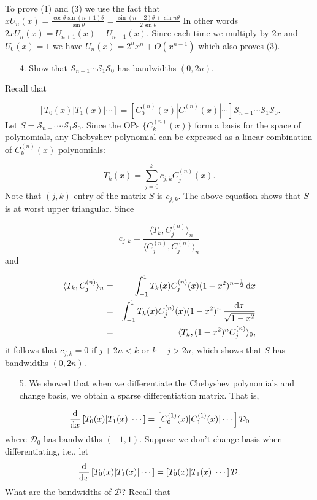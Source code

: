 \documentclass[12pt,a4paper]{article}
\begin{document}
To prove (1) and (3) we use the fact that $xU_n(x)=\frac{\cos\theta\sin(n+1)\theta}{\sin\theta}=\frac{\sin (n+2)\theta+\sin n\theta}{2\sin\theta}$ In other words $2xU_n(x)=U_{n+1}(x)+U_{n-1}(x)$. Since each time we multiply by $2x$ and $U_0(x)=1$ we have $U_n(x) = 2^n x^n + O(x^{n-1})$ which also proves (3).

\begin{itemize}
\item[4. ] Show that $\mathcal{S}_{n-1}\cdots\mathcal{S}_1\mathcal{S}_0$ has bandwidths $(0,2n)$.

\end{itemize}
Recall that 

\[
\left[T_0(x) | T_1(x) | \cdots  \right] =\left[C^{(n)}_0(x) | C^{(n)}_1(x) | \cdots  \right]  \mathcal{S}_{n-1}\cdots\mathcal{S}_1\mathcal{S}_0.
\]
Let $S = \mathcal{S}_{n-1}\cdots\mathcal{S}_1\mathcal{S}_0$.  Since the OPs $\{C^{(n)}_k(x)\} $ form a basis for the space of polynomials, any Chebyshev polynomial can be expressed as a linear combination of $C^{(n)}_k(x)$ polynomials:

\[
T_k(x) = \sum_{j = 0}^{k} c_{j,k}C^{(n)}_j(x).
\]
Note that $(j,k)$ entry of the matrix $S$ is $c_{j,k}$.  The above equation shows that $S$ is at worst upper triangular. Since

\[
c_{j,k} = \frac{\langle T_k,  C^{(n)}_j \rangle_{n}}{\langle C^{(n)}_j, C^{(n)}_j \rangle_n}
\]
and


\begin{eqnarray*}
\langle T_k,  C^{(n)}_j \rangle_{n} &=& \int_{-1}^{1}T_k(x) C^{(n)}_j(x)(1 - x^2)^{n-\frac{1}{2}}\,{\rm d}x \\
&=& \int_{-1}^{1}T_k(x) C^{(n)}_j(x)(1 - x^2)^{n}\,\frac{{\rm d}x}{\sqrt{1-x^2}} \\
&=& \langle T_k,  (1-x^2)^nC^{(n)}_j \rangle_{0},
\end{eqnarray*}
it follows that $c_{j,k} = 0$ if $j + 2n<k$ or $k-j>2n$, which shows that $S$ has bandwidths $(0, 2n)$.

\begin{itemize}
\item[5. ] We showed that when we differentiate the Chebyshev polynomials and change basis, we obtain a sparse differentiation matrix.   That is,

\end{itemize}
\[
\frac{{\rm d}}{{\rm d}x}\left[T_0(x) | T_1(x) | \cdots    \right] = \left[C^{(1)}_0(x) | C^{(1)}_1(x) | \cdots  \right]\mathcal{D}_0
\]
where $\mathcal{D}_0$ has bandwidths $(-1,1)$.  Suppose we don't change basis when differentiating, i.e., let
\[
\frac{{\rm d}}{{\rm d}x}\left[T_0(x) | T_1(x) | \cdots    \right] = \left[T_0(x) | T_1(x) | \cdots    \right]\mathcal{D}.
\]
What are the bandwidths of $\mathcal{D}$?
Recall that 
\end{document}
